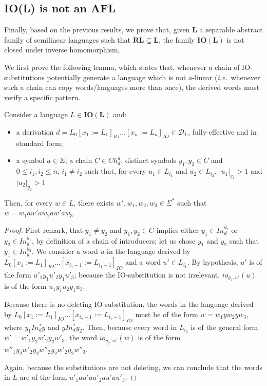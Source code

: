 \subsection{\textbf{IO(L)} is not an AFL}

Finally, based on the previous results, we prove that,  given $\mathbf{L}$ a separable abstract family of semilinear languages such that $\mathbf{RL} \subseteq \mathbf{L}$, the family $\mathbf{IO(L)}$ is not closed under inverse homomorphism,

We first prove the following lemma, which states that, whenever a chain of IO-substitutions potentially generate a language which is not $a$-linear (\textit{i.e.}~whenever such a chain can  copy words/languages more than once), the derived words must verify a specific pattern.

\begin{lemma}\label{lem:copy-separation}
  Consider a language $L \in \mathbf{IO(L)}$ and:
  \begin{itemize}
    \item a derivation $d=L_0[x_1:=L_1]_{IO} \dots [x_n:=L_n]_{IO} \in \mathcal{D}_L$, fully-effective and in standard form;
    \item a symbol $a \in \Sigma$, a chain $C \in Ch_d^a$, distinct symbols $y_1, y_2 \in C$ and $0 \leq i_1, i_2 \leq n$, $i_1 \neq i_2$ such that, for every $u_1 \in L_{i_1}$ and $u_2 \in L_{i_2}$, $|u_1|_{y_1} > 1$ and $|u_2|_{y_2} > 1$
    \end{itemize}
    Then, for every $w \in L$, there exists $w', w_1, w_2, w_3 \in \Sigma^\ast$ such that $w=w_1aw'aw_2aw'aw_3$.
\end{lemma}
\begin{proof}
First remark, that $y_1 \neq y_2$ and $y_1, y_2 \in C$ implies either $y_1 \in {In}_{d}^{y_2}$ or $y_2 \in {In}_{d}^{y_1}$, by definition of a chain of introducers; let us chose $y_1$ and $y_2$ such that $y_1 \in {In}_{d}^{y_2}$.
We consider a word $u$ in the language derived by $L_0[x_1:=L_1]_{IO} \dots [x_{i_1-1}:=L_{{i_1}-1}]_{IO}$ and a word $u' \in L_{i_1}$.
By hypothesis, $u'$ is of the form $u'_{1}y_1u'_{2}y_1u'_{3}$; because the IO-substitution is not irrelevant, $io_{y_1, u'}(u)$ is of the form $u_1y_1u_2y_1u_3$.

Because there is no deleting IO-substitution, the words in the language derived by $L_{0}[x_{1}:=L_{1}]_{IO} \dots [x_{i_2-1}:=L_{i_2-1}]_{IO}$ must be of the form $w=w_1yw_2yw_3$, where $y_1 {In_d^\ast} y$ and $y {In_d^\ast} y_2$.
Then, because every word in $L_{i_2}$ is of the general form $w'=w'_{1}y_2w'_{2}y_2w'_{3}$, the word $io_{y_2, w'}(w)$ is of the form $w''_1y_2w'_{2}y_2w''_2y_2w'_{2}y_2w''_3$.

Again, because the substitutions are not deleting, we can conclude that the words in $L$ are of the form $u'_1au'au'_2au'au'_3$.
\end{proof}

